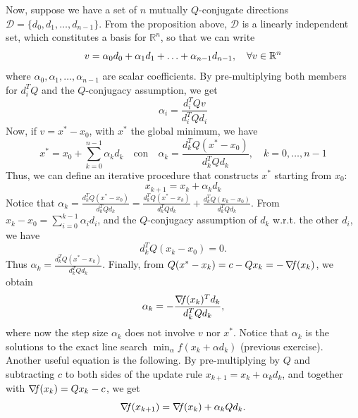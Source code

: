 \documentclass[10pt,a4paper]{article}
\begin{document}
\noindent Now, suppose we have a set of $n$ mutually $Q$-conjugate directions $\mathcal{D} = \{d_0, d_1, \ldots, d_{n-1}\}$. From the proposition above, $\mathcal{D}$ is a linearly independent set, which constitutes a basis for $\mathbb{R}^n$, so that we can write
\begin{equation*}
	v = \alpha_0 d_0 + \alpha_1 d_1 + \ldots + \alpha_{n-1} d_{n-1}, \quad \forall v \in \mathbb{R}^n
\end{equation*}
where $\alpha_0, \alpha_1, \ldots, \alpha_{n-1}$ are scalar coefficients. By pre-multiplying both members for $d_i^T Q$ and the $Q$-conjugacy assumption, we get 
\begin{equation*}
	\alpha_i = \frac{d_i^T Q v}{d_i^T Q d_i}
\end{equation*}
Now, if $v= x^* - x_0$, with $x^*$ the global minimum, we have 
\begin{equation*}
	x^* = x_0 + \sum_{k=0}^{n-1} \alpha_k d_k \quad \text{con} \quad \alpha_k = \frac{d_k^T Q(x^* - x_0)}{d_k^T Q d_k}, \quad k = 0, \ldots, n - 1
\end{equation*}
Thus, we can define an iterative procedure that constructs $x^*$ starting from $x_0$:
\begin{equation*}
	x_{k+1} = x_k + \alpha_k d_k
\end{equation*}
Notice that $\alpha_k = \frac{d_k^T Q(x^* - x_0)}{d_k^T Q d_k} = \frac{d_k^T Q(x^* - x_k)}{d_k^T Q d_k} + \frac{d_k^T Q(x_k - x_0)}{d_k^T Q d_k}$. From $x_k - x_0 = \sum_{i=0}^{k-1} \alpha_i d_i$, and the $Q$-conjugacy assumption of $d_k$ w.r.t. the other $d_i$, we have
\begin{equation*}
	d_k^T Q(x_k - x_0) = 0. 
\end{equation*}
Thus $\alpha_k = \frac{d_k^T Q(x^* - x_k)}{d_k^T Q d_k}$. 
Finally, from $Q(x^* - x_k) = c - Q x_k = -\operatorname*{\mathit{\nabla \!f}}(x_k)$, we obtain
\begin{equation}\label{eq:conjugate_alpha}
	\alpha_k = -\frac{\operatorname*{\mathit{\nabla \!f}} (x_k)^T d_k}{d_k^T Q d_k},
\end{equation}
where now the step size $\alpha_k$ does not involve $v$ nor $x^*$. Notice that $\alpha_k$ is the solutions to the exact line search $\min_\alpha f(x_k+\alpha d_k)$ (previous exercise).\\
Another useful equation is the following. By pre-multiplying by $Q$ and subtracting $c$ to both sides of the update rule $x_{k+1} = x_k + \alpha_k d_k$, and together with $\operatorname*{\mathit{\nabla \!f}}(x_k)= Qx_k -c$, we get 
\begin{equation}\label{eq:12.11}
	\operatorname*{\mathit{\nabla \!f}}(x_{k+1}) = \operatorname*{\mathit{\nabla \!f}}(x_k) + \alpha_k Q d_k. 
\end{equation}
\end{document}
